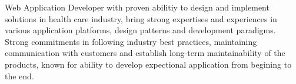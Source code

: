 

\begin{cvparagraph}

Web Application Developer with proven abilitiy to design and implement solutions in health care industry, bring strong expertises and experiences in various application platforms, design patterns and development paradigms. Strong commitments in following industry best practices, maintaining communication with customers and establish long-term maintainability of the products, known for ability to develop expectional application from begining to the end. 
\end{cvparagraph}
